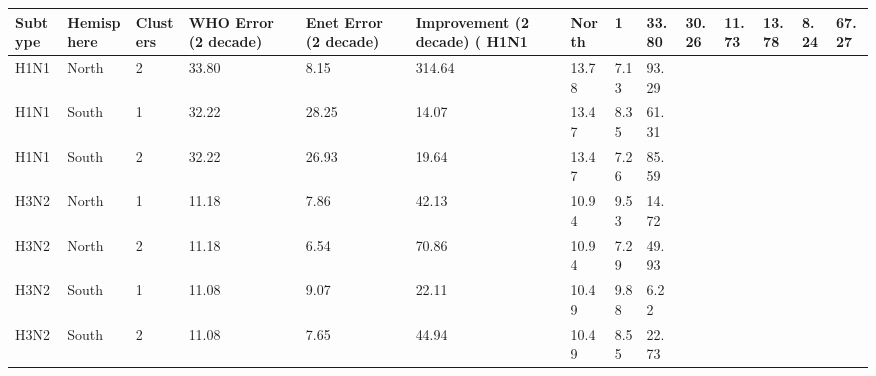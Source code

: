 \begin{tabular}{L{1in}|L{1in}|L{1in}|L{1in}|L{1in}|L{1in}|L{1in}|L{1in}|L{1in}}\hline
 Subtype & Hemisphere & Clusters & WHO  Error  (2  decade) & Enet  Error  (2  decade) & Improvement  (2  decade)  (%
H1N1& North &1&33.80&30.26&11.73&13.78&8.24&67.27\\\hline
H1N1& North &2&33.80&8.15&314.64&13.78&7.13&93.29\\\hline
H1N1& South &1&32.22&28.25&14.07&13.47&8.35&61.31\\\hline
H1N1& South &2&32.22&26.93&19.64&13.47&7.26&85.59\\\hline
H3N2& North &1&11.18&7.86&42.13&10.94&9.53&14.72\\\hline
H3N2& North &2&11.18&6.54&70.86&10.94&7.29&49.93\\\hline
H3N2& South &1&11.08&9.07&22.11&10.49&9.88&6.22\\\hline
H3N2& South &2&11.08&7.65&44.94&10.49&8.55&22.73\\\hline
\hline\end{tabular}
